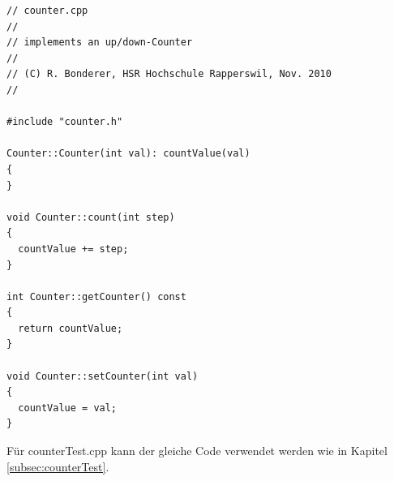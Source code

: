 \begin{lstlisting}[style=Cpp]
// counter.cpp
//
// implements an up/down-Counter
//
// (C) R. Bonderer, HSR Hochschule Rapperswil, Nov. 2010
//

#include "counter.h"

Counter::Counter(int val): countValue(val)
{
}

void Counter::count(int step)
{
  countValue += step;
}

int Counter::getCounter() const
{
  return countValue;
}

void Counter::setCounter(int val)
{
  countValue = val;
}
\end{lstlisting}

Für counterTest.cpp kann der gleiche Code verwendet werden wie in Kapitel \ref{subsec:counterTest}. \\

